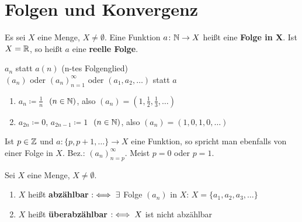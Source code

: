 \section{Folgen und Konvergenz}


\begin{definition*}  
	Es sei $X$ eine Menge, $X \neq \emptyset$. Eine Funktion $a \colon \mathbb{N} \to X$ hei{\ss}t eine \textbf{Folge in X}. Ist $X = \mathbb{R}$, so hei{\ss}t $a$ eine \textbf{reelle Folge}.
\end{definition*}


\begin{schreibweisen}
$a_{n}$ statt $a(n)$ (n-tes Folgenglied) \\
$(a_{n})$ oder $(a_{n})_{n = 1}^{\infty}$ oder $(a_{1}, a_{2}, \dotsc)$ statt $a$
\end{schreibweisen}


\begin{beispiele*}
	\begin{enumerate}
		\item $a_{n} \coloneqq \frac{1}{n}$ $~(n \in \mathbb{N})$, also $(a_{n}) = (1, \frac{1}{2}, \frac{1}{3}, \dotsc)$
		\item $a_{2n} \coloneqq 0$, $a_{2n-1} \coloneqq 1$ $~(n \in \mathbb{N})$, also $(a_{n}) = (1, 0, 1, 0, \dotsc)$
	\end{enumerate}
\end{beispiele*}


\begin{bemerkung*}
	Ist $p \in \mathbb{Z}$ und $a \colon \{ p, p + 1, \dotsc \} \to X$ eine Funktion, so spricht man ebenfalls von einer Folge in $X$. Bez.: $(a_{n})_{n = p}^{\infty}$. Meist $p = 0$ oder $p = 1$.
\end{bemerkung*}


\begin{definition*}  
	Sei $X$ eine Menge, $X \neq \emptyset$.
	\begin{enumerate}
		\item $X$ hei{\ss}t \textbf{abzählbar} $:\iff \exists$ Folge $(a_{n})$ in $X$: $X = \{ a_{1}, a_{2}, a_{3}, \dotsc \}$
		\item $X$ hei{\ss}t \textbf{überabzählbar} $:\iff X$ ist nicht abzählbar
	\end{enumerate}
\end{definition*}



